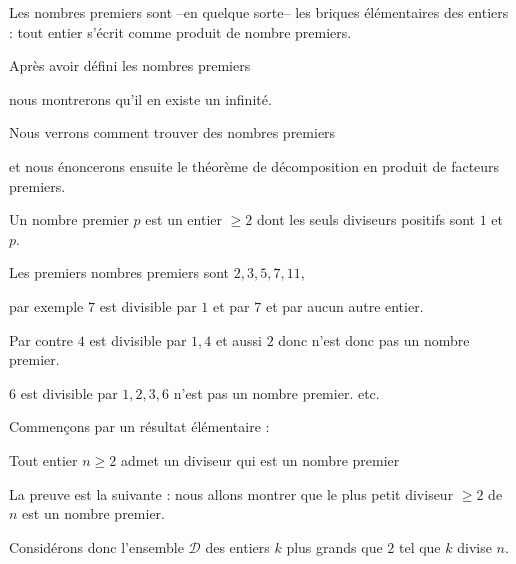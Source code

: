 





\debuttexte

\diapo

\change

Les nombres premiers sont --en quelque sorte-- les briques élémentaires des entiers :
tout entier s'écrit comme produit de nombre premiers.

\change

Après avoir défini les nombres premiers

nous montrerons qu'il en existe un infinité.

\change

Nous verrons comment trouver des nombres premiers

\change

et nous énoncerons ensuite le théorème de décomposition
en produit de facteurs premiers.



\diapo

Un {nombre premier} $p$ est un entier $\ge 2$ dont les seuls diviseurs  
positifs sont $1$ et $p$.


\change
Les premiers nombres premiers sont $2, 3, 5, 7, 11$,

par exemple $7$ est divisible par $1$ et par $7$ et par aucun autre entier.

\change


Par contre $4$ est divisible par $1, 4$ et aussi $2$ donc n'est donc pas un nombre premier.

$6$ est divisible par $1,2,3,6$ n'est pas un nombre premier. etc.





\diapo

Commençons par un résultat élémentaire :

Tout entier $n \ge 2$ admet un diviseur qui est un nombre premier


\change


La preuve est la suivante : nous allons montrer que le plus petit diviseur $\ge 2$
de $n$ est un nombre premier.

Considérons donc l'ensemble $\mathcal{D}$ des entiers $k$ plus grands que $2$ tel que $k$ divise $n$.

